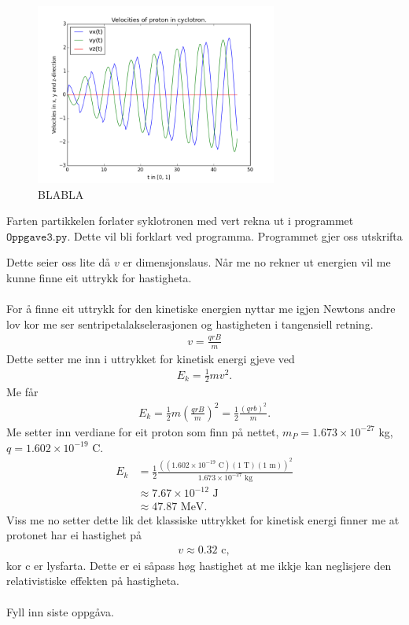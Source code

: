 \documentclass[11pt, a4paper]{article}
\begin{document}
  \begin{figure}[H]
    \centering
    \includegraphics[width=300px]{3A2.png}
    \caption{BLABLA}
  \end{figure}

  Farten partikkelen forlater syklotronen med vert rekna ut i programmet $\texttt{Oppgave3.py}$. Dette vil bli forklart ved programma. %
  Programmet gjer oss utskrifta
  \begin{center}
    
  \end{center}
  Dette seier oss lite då $v$ er dimensjonslaus. Når me no rekner ut energien vil me kunne finne eit uttrykk for hastigheta. \\ \\
  For å finne eit uttrykk for den kinetiske energien nyttar me igjen Newtons andre lov kor me ser sentripetalakselerasjonen og hastigheten i tangensiell retning.
  \begin{align*}
    v = \frac{qrB}{m}
  \end{align*}
  Dette setter me inn i uttrykket for kinetisk energi gjeve ved
  \begin{align*}
    E_k = \frac{1}{2}mv^2.
  \end{align*}
  Me får
  \begin{align*}
    E_k = \frac{1}{2}m\left( \frac{qrB}{m} \right)^2 = \frac{1}{2}\frac{\left( qrb \right)^2}{m}.
  \end{align*}
  Me setter inn verdiane for eit proton som finn på nettet, $m_P = 1.673\times10^{-27}$ kg, $q = 1.602\times10^{-19}$ C.
  \begin{align*}
    E_k &= \frac{1}{2}\frac{\left( (1.602\times10^{-19}\text{ C})(1 \text{ T})(1\text{ m}) \right)^2}{1.673\times10^{-27}\text{ kg}} \\
    &\approx 7.67\times10^{-12}\text{ J} \\
    &\approx 47.87 \text{ MeV}.
  \end{align*}
  Viss me no setter dette lik det klassiske uttrykket for kinetisk energi finner me at protonet har ei hastighet på 
  \begin{align*}
    v \approx 0.32\text{ c},
  \end{align*}
  kor c er lysfarta. Dette er ei såpass høg hastighet at me ikkje kan neglisjere den relativistiske effekten på hastigheta. \\ \\


  Fyll inn siste oppgåva.
\end{document}
